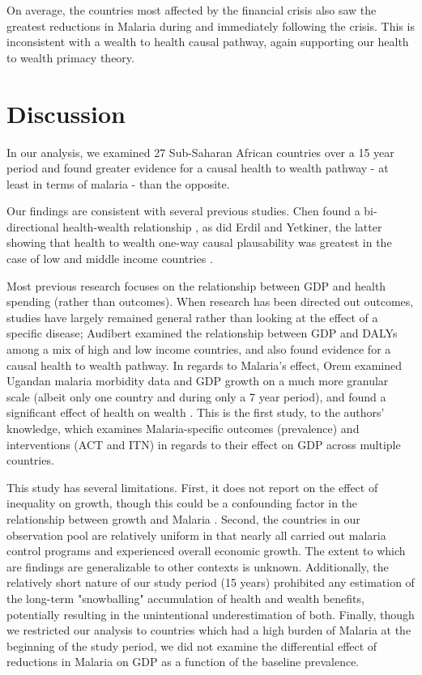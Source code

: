 \documentclass[9pt,twocolumn,twoside,lineno]{pnas-new}
\begin{document}
On average, the countries most affected by the financial crisis also saw the greatest reductions in Malaria during and immediately following the crisis. This is inconsistent with a wealth to health causal pathway, again supporting our health to wealth primacy theory.



\section*{Discussion}

In our analysis, we examined 27 Sub-Saharan African countries over a 15 year period and found greater evidence for a causal health to wealth pathway - at least in terms of malaria - than the opposite. 

Our findings are consistent with several previous studies. Chen found a bi-directional health-wealth relationship \cite{Chen_2013}, as did Erdil and Yetkiner, the latter showing that health to wealth one-way causal plausability was greatest in the case of low and middle income countries \cite{Erdil_2009}. 

Most previous research focuses on the relationship between GDP and health spending (rather than outcomes). When research has been directed out outcomes, studies have largely remained general rather than looking at the effect of a specific disease; Audibert examined the relationship between GDP and DALYs among a mix of high and low income countries, and also found evidence for a causal health to wealth pathway. In regards to Malaria's effect, Orem examined Ugandan malaria morbidity data and GDP growth on a much more granular scale (albeit only one country and during only a 7 year period), and found a significant effect of health on wealth \cite{Orem_2012}. This is the first study, to the authors' knowledge, which examines Malaria-specific outcomes (prevalence) and interventions (ACT and ITN) in regards to their effect on GDP across multiple countries.

This study has several limitations. First, it does not report on the effect of inequality on growth, though this could be a confounding factor in the relationship between growth and Malaria \cite{Asafu_Adjaye_2004}. Second, the countries in our observation pool are relatively uniform in that nearly all carried out malaria control programs and experienced overall economic growth. The extent to which are findings are generalizable to other contexts is unknown. Additionally, the relatively short nature of our study period (15 years) prohibited any estimation of the long-term "snowballing" accumulation of health and wealth benefits, potentially resulting in the unintentional underestimation of both. Finally, though we restricted our analysis to countries which had a high burden of Malaria at the beginning of the study period, we did not examine the differential effect of reductions in Malaria on GDP as a function of the baseline prevalence.
\end{document}
